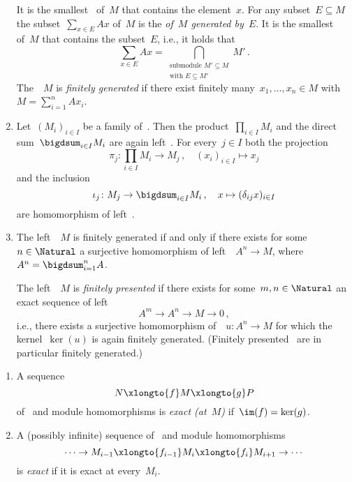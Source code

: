 \begin{remarkdefinition}
\begin{enumerate}
      It is the smallest~{} of~$M$ that contains the element~$x$.
      For any subset~$E \subseteq M$ the subset~$\sum_{x \in E} Ax$ of~$M$ is the \emph{{} of~$M$ generated by~$E$}.
      It is the smallest~{} of~$M$ that contains the subset~$E$, i.e., it holds that
      \[
          \sum_{x \in E} Ax
        = \bigcap_{\substack{\text{submodule $M' \subseteq M$} \\ \text{with $E \subseteq M'$}}} M' \,.
      \]
      The~{}~$M$ is \emph{finitely generated} if there exist finitely many~$x_1, \dotsc, x_n \in M$ with~$M = \sum_{i=1}^n A x_i$.
    \item
      Let~$(M_i)_{i \in I}$ be a family of~{}.
      Then the product~$\prod_{i \in I} M_i$ and the direct sum~$\bigdsum_{i \in I} M_i$ are again left~{}.
      For every~$j \in I$ both the projection
      \[
                \pi_j
        \colon  \prod_{i \in I} M_i
        \to     M_j \,,
        \quad   (x_i)_{i \in I}
        \mapsto x_j
      \]
      and the inclusion
      \[
                \iota_j
        \colon  M_j
        \to     \bigdsum_{i \in I} M_i \,,
        \quad   x
        \mapsto ( \delta_{ij} x )_{i \in I}
      \]
      are homomorphism of left~{}.
    \item
      The left~{}~$M$ is finitely generated if and only if there exists for some~$n \in \Natural$ a surjective homomorphism of left~{}~$A^n \to M$, where~$A^n = \bigdsum_{i=1}^n A$.
      
      The left~{}~$M$ is \emph{finitely presented} if there exists for some~$m, n \in \Natural$ an exact sequence of left~{}
      \[
            A^m
        \to A^n
        \to M
        \to 0 \,,
      \]
      i.e., there exists a surjective homomorphism of~{}~$u \colon A^n \to M$ for which the kernel~$\ker(u)$ is again finitely generated.
      (Finitely presented~{} are in particular finitely generated.)
  \end{enumerate}
\end{remarkdefinition}


\begin{definition*}
  \leavevmode
  \begin{enumerate}
    \item
      A sequence
      \[
        N
        \xlongto{f}
        M
        \xlongto{g}
        P
      \]
      of~{} and module homomorphisms is \emph{exact \textup(at~$M$\textup)} if~$\im(f) = \ker(g)$.
    \item
      A (possibly infinite) sequence of~{} and module homomorphisms
      \[
        \dotsb
        \to
        M_{i-1}
        \xlongto{f_{i-1}}
        M_i
        \xlongto{f_i}
        M_{i+1}
        \to
        \dotsb
      \]
      is \emph{exact} if it is exact at every~$M_i$.
  \end{enumerate}
\end{definition*}


